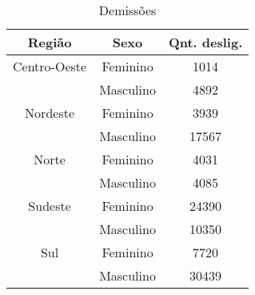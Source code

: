 \begin{table}[htbp]
	\caption{Demissões}
	\begin{center}
		\begin{tabular}{|c|c|c|}
			\hline
			\textbf{Região} & \textbf{Sexo} & \textbf{Qnt. deslig.} \\ 
			\hline																
			Centro-Oeste     & Feminino      & 1014                  \\
			                 & Masculino     & 4892                  \\
			\hline
			Nordeste         & Feminino      & 3939                  \\
			                 & Masculino     & 17567                 \\
			\hline
			Norte            & Feminino      & 4031                  \\
			                 & Masculino     & 4085                  \\
			\hline
			Sudeste          & Feminino      & 24390                 \\
			                 & Masculino     & 10350                 \\
			\hline
			Sul              & Feminino      & 7720                  \\
			                 & Masculino     & 30439                 \\
			\hline
		\end{tabular}
		\label{demi20}
	\end{center}
\end{table}
